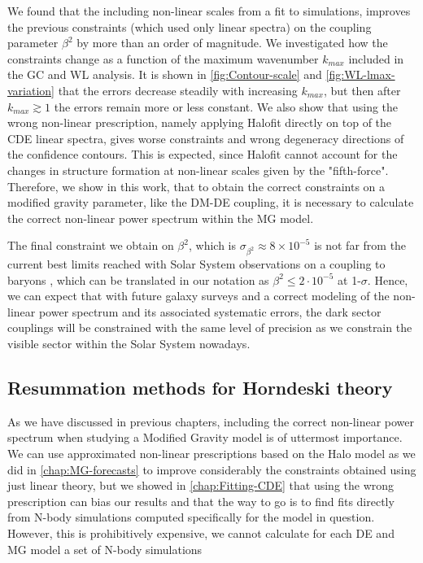 We found that the including non-linear scales from a fit to simulations, improves the previous constraints (which used only linear spectra) on the coupling parameter $\beta^2$ 
by more than an order of magnitude. 
We investigated how the constraints change as a function of the maximum wavenumber $k_{max}$ included in the GC and WL analysis.
It is shown in \cref{fig:Contour-scale} and \cref{fig:WL-lmax-variation} that the errors decrease steadily with increasing $k_{max}$,
but then after $k_{max} \gtrsim 1$ the errors remain more or less constant.
We also show that using the wrong non-linear prescription, namely applying Halofit directly on top of the CDE linear spectra,
gives worse constraints and wrong degeneracy directions of the confidence contours. This is expected, since Halofit cannot account for the 
changes in structure formation at non-linear scales given by the "fifth-force".
Therefore, we show in this work, that to obtain the correct constraints on a modified gravity parameter, like the DM-DE coupling, 
it is necessary to calculate the correct non-linear power spectrum within the MG model.

The final constraint we obtain on $\beta^2$, which is $\sigma_{\beta^2} \approx 8\times 10^{-5}$ 
is not far from the current
best limits reached with Solar System observations on a coupling to
baryons \cite{Agashe:2014kda}, which can be translated in our notation
as $\beta^{2}\le2\cdot10^{-5}$ at 1-$\sigma$.
Hence, we can expect that with future galaxy surveys and a correct modeling of the non-linear power spectrum and its associated
systematic errors, the dark sector couplings will be constrained with the same level of precision as we constrain the visible sector
within the Solar System nowadays.

\subsection*{Resummation methods for Horndeski theory}

As we have discussed in previous chapters, including the correct non-linear power spectrum when studying a Modified Gravity model
is of uttermost importance. We can use approximated non-linear prescriptions based on the Halo model as we did in \cref{chap:MG-forecasts}
to improve considerably the constraints obtained using just linear theory,
but we showed in \cref{chap:Fitting-CDE} that using the wrong prescription can bias our results and that the way to go is to 
find fits directly from N-body simulations computed specifically for the model in question.
However, this is prohibitively expensive, we cannot calculate for each DE and MG model a set of N-body simulations  


















